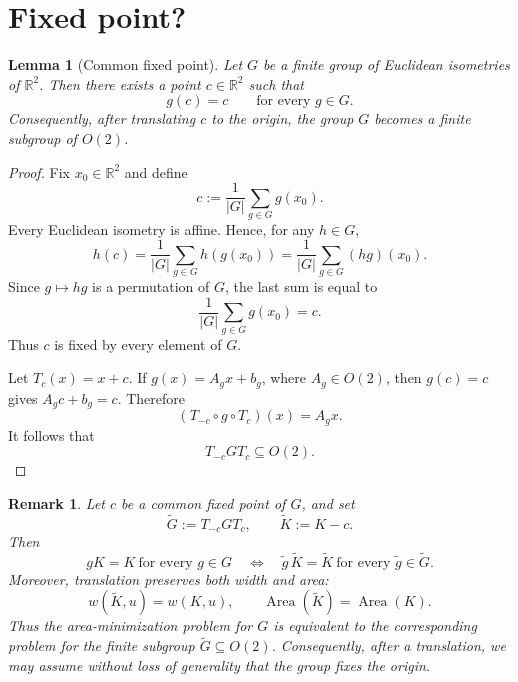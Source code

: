\documentclass[11pt,letterpaper,reqno]{amsart}
\newtheorem{lemma}[theorem]{Lemma}
\newtheorem{remark}[theorem]{Remark}
\begin{document}
\iffalse
\section{Fixed point?}
\begin{lemma}[Common fixed point]\label{lem:finite-group-fixed-point}
Let $G$ be a finite group of Euclidean isometries of $\mathbb R^2$.
Then there exists a point $c\in\mathbb R^2$ such that
\[
g(c)=c
\qquad\text{for every }g\in G.
\]
Consequently, after translating $c$ to the origin, the group $G$
becomes a finite subgroup of $O(2)$.
\end{lemma}

\begin{proof}
Fix $x_0\in\mathbb R^2$ and define
\[
c:=\frac{1}{|G|}\sum_{g\in G}g(x_0).
\]
Every Euclidean isometry is affine. Hence, for any $h\in G$,
\[
h(c)
=
\frac{1}{|G|}\sum_{g\in G}h(g(x_0))
=
\frac{1}{|G|}\sum_{g\in G}(hg)(x_0).
\]
Since $g\mapsto hg$ is a permutation of $G$, the last sum is equal to
\[
\frac{1}{|G|}\sum_{g\in G}g(x_0)=c.
\]
Thus $c$ is fixed by every element of $G$.

Let $T_c(x)=x+c$. If $g(x)=A_gx+b_g$, where $A_g\in O(2)$, then
$g(c)=c$ gives $A_gc+b_g=c$. Therefore
\[
(T_{-c}\circ g\circ T_c)(x)
=
A_gx.
\]
It follows that
\[
T_{-c}GT_c\subseteq O(2).
\]
\end{proof}
\begin{remark}\label{rem:translation-reduction}
Let $c$ be a common fixed point of $G$, and set
\[
\widetilde G:=T_{-c}GT_c,
\qquad
\widetilde K:=K-c.
\]
Then
\[
gK=K\ \text{for every }g\in G
\quad\Longleftrightarrow\quad
\widetilde g\,\widetilde K=\widetilde K
\ \text{for every }\widetilde g\in\widetilde G.
\]
Moreover, translation preserves both width and area:
\[
w(\widetilde K,u)=w(K,u),
\qquad
\operatorname{Area}(\widetilde K)=\operatorname{Area}(K).
\]
Thus the area-minimization problem for $G$ is equivalent to the
corresponding problem for the finite subgroup
$\widetilde G\subseteq O(2)$. Consequently, after a translation, we
may assume without loss of generality that the group fixes the origin.
\end{remark}
\end{document}
